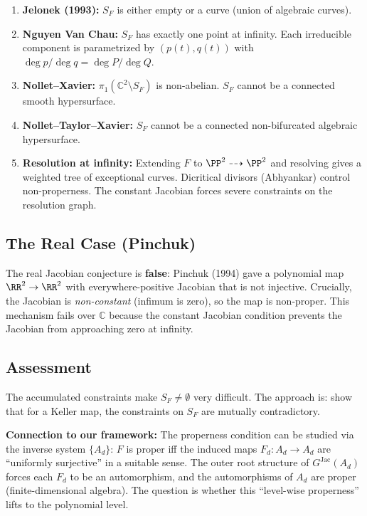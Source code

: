\documentclass[12pt,a4paper]{article}
\theoremstyle{definition}
\newcommand{\CC}{\mathbb{C}}
\newcommand{\GJac}{G^{\mathrm{Jac}}}
\begin{document}
\begin{enumerate}
\item \textbf{Jelonek (1993):} $S_F$ is either empty or a curve (union of algebraic curves).
\item \textbf{Nguyen Van Chau:} $S_F$ has exactly one point at infinity. Each irreducible
  component is parametrized by $(p(t), q(t))$ with $\deg p / \deg q = \deg P / \deg Q$.
\item \textbf{Nollet--Xavier:} $\pi_1(\CC^2 \setminus S_F)$ is non-abelian.
  $S_F$ cannot be a connected smooth hypersurface.
\item \textbf{Nollet--Taylor--Xavier:} $S_F$ cannot be a connected non-bifurcated
  algebraic hypersurface.
\item \textbf{Resolution at infinity:} Extending $F$ to $\PP^2 \dashrightarrow \PP^2$
  and resolving gives a weighted tree of exceptional curves. Dicritical divisors
  (Abhyankar) control non-properness. The constant Jacobian forces severe constraints
  on the resolution graph.
\end{enumerate}

\subsection{The Real Case (Pinchuk)}
The real Jacobian conjecture is \textbf{false}: Pinchuk (1994) gave a polynomial map
$\RR^2 \to \RR^2$ with everywhere-positive Jacobian that is not injective. Crucially,
the Jacobian is \emph{non-constant} (infimum is zero), so the map is non-proper.
This mechanism fails over $\CC$ because the constant Jacobian condition prevents
the Jacobian from approaching zero at infinity.

\subsection{Assessment}
The accumulated constraints make $S_F \neq \emptyset$ very difficult. The approach is:
show that for a Keller map, the constraints on $S_F$ are mutually contradictory.

\textbf{Connection to our framework:} The properness condition can be studied via the
inverse system $\{A_d\}$: $F$ is proper iff the induced maps $F_d: A_d \to A_d$ are
``uniformly surjective'' in a suitable sense. The outer root structure of $\GJac(A_d)$
forces each $F_d$ to be an automorphism, and the automorphisms of $A_d$ are proper
(finite-dimensional algebra). The question is whether this ``level-wise properness''
lifts to the polynomial level.
\end{document}
